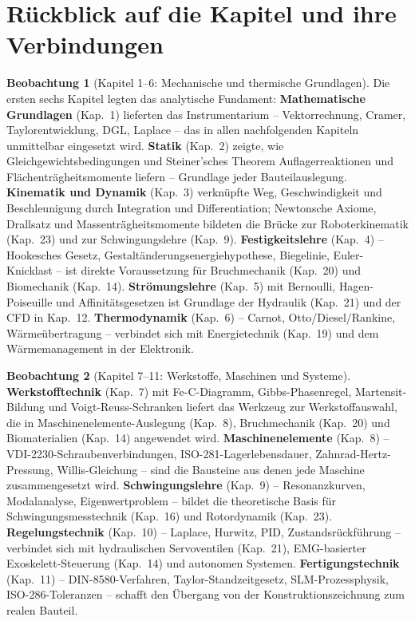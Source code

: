 ﻿\documentclass[a4paper,12pt]{report}
\theoremstyle{definition}
\newtheorem{beobachtung}{Beobachtung}
\begin{document}
\section{Rückblick auf die Kapitel und ihre Verbindungen}

\begin{beobachtung}[Kapitel 1--6: Mechanische und thermische Grundlagen]
Die ersten sechs Kapitel legten das analytische Fundament:
\textbf{Mathematische Grundlagen} (Kap.~1) lieferten das Instrumentarium
-- Vektorrechnung, Cramer, Taylorentwicklung, DGL, Laplace --
das in allen nachfolgenden Kapiteln unmittelbar eingesetzt wird.
\textbf{Statik} (Kap.~2) zeigte, wie Gleichgewichtsbedingungen
und Steiner'sches Theorem Auflagerreaktionen und Flächenträgheitsmomente
liefern -- Grundlage jeder Bauteilauslegung.
\textbf{Kinematik und Dynamik} (Kap.~3) verknüpfte Weg, Geschwindigkeit
und Beschleunigung durch Integration und Differentiation;
Newtonsche Axiome, Drallsatz und Massenträgheitsmomente
bildeten die Brücke zur Roboterkinematik (Kap.~23) und zur
Schwingungslehre (Kap.~9).
\textbf{Festigkeitslehre} (Kap.~4) -- Hookesches Gesetz, Gestaltänderungsenergiehypothese,
Biegelinie, Euler-Knicklast -- ist direkte Voraussetzung für
Bruchmechanik (Kap.~20) und Biomechanik (Kap.~14).
\textbf{Strömungslehre} (Kap.~5) mit Bernoulli, Hagen-Poiseuille
und Affinitätsgesetzen ist Grundlage der Hydraulik (Kap.~21)
und der CFD in Kap.~12.
\textbf{Thermodynamik} (Kap.~6) -- Carnot, Otto/Diesel/Rankine,
Wärmeübertragung -- verbindet sich mit Energietechnik (Kap.~19)
und dem Wärmemanagement in der Elektronik.
\end{beobachtung}

\begin{beobachtung}[Kapitel 7--11: Werkstoffe, Maschinen und Systeme]
\textbf{Werkstofftechnik} (Kap.~7) mit Fe-C-Diagramm, Gibbs-Phasenregel,
Martensit-Bildung und Voigt-Reuss-Schranken liefert das Werkzeug zur
Werkstoffauswahl, die in Maschinenelemente-Auslegung (Kap.~8),
Bruchmechanik (Kap.~20) und Biomaterialien (Kap.~14) angewendet wird.
\textbf{Maschinenelemente} (Kap.~8) -- VDI-2230-Schraubenverbindungen,
ISO-281-Lagerlebensdauer, Zahnrad-Hertz-Pressung, Willis-Gleichung --
sind die Bausteine aus denen jede Maschine zusammengesetzt wird.
\textbf{Schwingungslehre} (Kap.~9) -- Resonanzkurven, Modalanalyse,
Eigenwertproblem -- bildet die theoretische Basis für
Schwingungsmesstechnik (Kap.~16) und Rotordynamik (Kap.~23).
\textbf{Regelungstechnik} (Kap.~10) -- Laplace, Hurwitz, PID,
Zustandsrückführung -- verbindet sich mit hydraulischen Servoventilen (Kap.~21),
EMG-basierter Exoskelett-Steuerung (Kap.~14) und autonomen Systemen.
\textbf{Fertigungstechnik} (Kap.~11) -- DIN-8580-Verfahren, Taylor-Standzeitgesetz,
SLM-Prozessphysik, ISO-286-Toleranzen -- schafft den Übergang von
der Konstruktionszeichnung zum realen Bauteil.
\end{beobachtung}
\end{document}
